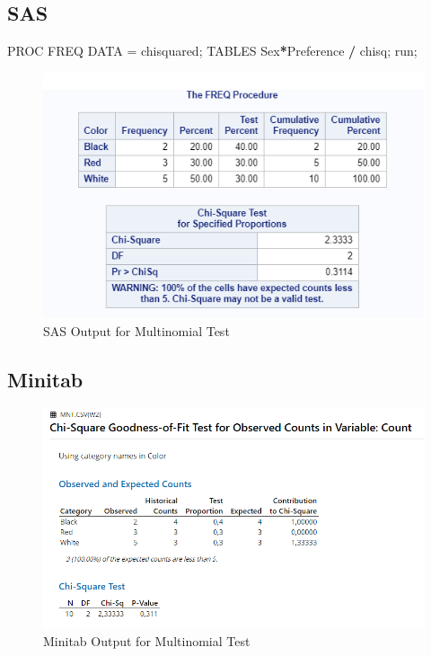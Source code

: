 \documentclass[
]{book}
\newenvironment{Shaded}{\begin{snugshade}}{\end{snugshade}}
\newcommand{\NormalTok}[1]{#1}
\newcommand{\OperatorTok}[1]{\textcolor[rgb]{0.81,0.36,0.00}{\textbf{#1}}}
\newcommand{\StringTok}[1]{\textcolor[rgb]{0.31,0.60,0.02}{#1}}
\begin{document}
\hypertarget{sas-1}{%
\subsection{SAS}\label{sas-1}}

\begin{Shaded}
\begin{Highlighting}[]
\NormalTok{PROC FREQ DATA =}\StringTok{ }\NormalTok{chisquared;}
\NormalTok{TABLES Sex}\OperatorTok{*}\NormalTok{Preference }\OperatorTok{/}\StringTok{ }\NormalTok{chisq;}
\NormalTok{run;}
\end{Highlighting}
\end{Shaded}

\begin{figure}[!h]
\includegraphics{Screenshots/Multinomial Test/mntSAS} \caption{\label{fig:mntSAS}SAS Output for Multinomial Test}\label{fig:mntSAS}
\end{figure}

\hypertarget{minitab-1}{%
\subsection{Minitab}\label{minitab-1}}

\begin{figure}[!h]
\includegraphics{Screenshots/Multinomial Test/mntMinitab} \caption{\label{fig:mntMinitab}Minitab Output for Multinomial Test}\label{fig:mntMinitab}
\end{figure}
\end{document}
